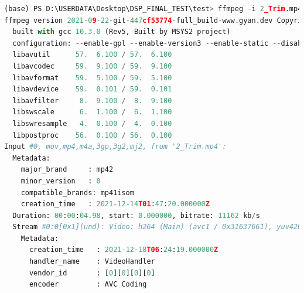 \documentclass[10pt,UTF8]{ctexart}
\begin{document}
\begin{lstlisting}[language={python}]
(base) PS D:\USERDATA\Desktop\DSP_FINAL_TEST\test> ffmpeg -i 2_Trim.mp4 -s 320x240 -pix_fmt yuv420p -r 15 2_Trim.yuv
ffmpeg version 2021-09-22-git-447cf53774-full_build-www.gyan.dev Copyright (c) 2000-2021 the FFmpeg developers
  built with gcc 10.3.0 (Rev5, Built by MSYS2 project)
  configuration: --enable-gpl --enable-version3 --enable-static --disable-w32threads --disable-autodetect --enable-fontconfig --enable-iconv --enable-gnutls --enable-libxml2 --enable-gmp --enable-lzma --enable-libsnappy --enable-zlib --enable-librist --enable-libsrt --enable-libssh --enable-libzmq --enable-avisynth --enable-libbluray --enable-libcaca --enable-sdl2 --enable-libdav1d --enable-libzvbi --enable-librav1e --enable-libsvtav1 --enable-libwebp --enable-libx264 --enable-libx265 --enable-libxvid --enable-libaom --enable-libopenjpeg --enable-libvpx --enable-libass --enable-frei0r --enable-libfreetype --enable-libfribidi --enable-libvidstab --enable-libvmaf --enable-libzimg --enable-amf --enable-cuda-llvm --enable-cuvid --enable-ffnvcodec --enable-nvdec --enable-nvenc --enable-d3d11va --enable-dxva2 --enable-libmfx --enable-libglslang --enable-vulkan --enable-opencl --enable-libcdio --enable-libgme --enable-libmodplug --enable-libopenmpt --enable-libopencore-amrwb --enable-libmp3lame --enable-libshine --enable-libtheora --enable-libtwolame --enable-libvo-amrwbenc --enable-libilbc --enable-libgsm --enable-libopencore-amrnb --enable-libopus --enable-libspeex --enable-libvorbis --enable-ladspa --enable-libbs2b --enable-libflite --enable-libmysofa --enable-librubberband --enable-libsoxr --enable-chromaprint
  libavutil      57.  6.100 / 57.  6.100
  libavcodec     59.  9.100 / 59.  9.100
  libavformat    59.  5.100 / 59.  5.100
  libavdevice    59.  0.101 / 59.  0.101
  libavfilter     8.  9.100 /  8.  9.100
  libswscale      6.  1.100 /  6.  1.100
  libswresample   4.  0.100 /  4.  0.100
  libpostproc    56.  0.100 / 56.  0.100
Input #0, mov,mp4,m4a,3gp,3g2,mj2, from '2_Trim.mp4':
  Metadata:
    major_brand     : mp42
    minor_version   : 0
    compatible_brands: mp41isom
    creation_time   : 2021-12-14T01:47:20.000000Z
  Duration: 00:00:04.98, start: 0.000000, bitrate: 11162 kb/s
  Stream #0:0[0x1](und): Video: h264 (Main) (avc1 / 0x31637661), yuv420p, 720x1280 [SAR 1:1 DAR 9:16], 11302 kb/s, 30 fps, 30 tbr, 30k tbn (default)
    Metadata:
      creation_time   : 2021-12-18T06:24:19.000000Z
      handler_name    : VideoHandler
      vendor_id       : [0][0][0][0]
      encoder         : AVC Coding

\end{lstlisting}
\end{document}

